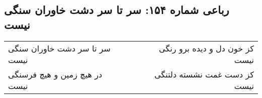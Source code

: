 \begin{center}
\section*{رباعی شماره ۱۵۴: سر تا سر دشت خاوران سنگی نیست}
\label{sec:sh154}
\begin{longtable}{l p{0.5cm} r}
سر تا سر دشت خاوران سنگی نیست
&&
کز خون دل و دیده برو رنگی نیست
\\
در هیچ زمین و هیچ فرسنگی نیست
&&
کز دست غمت نشسته دلتنگی نیست
\\
\end{longtable}
\end{center}
